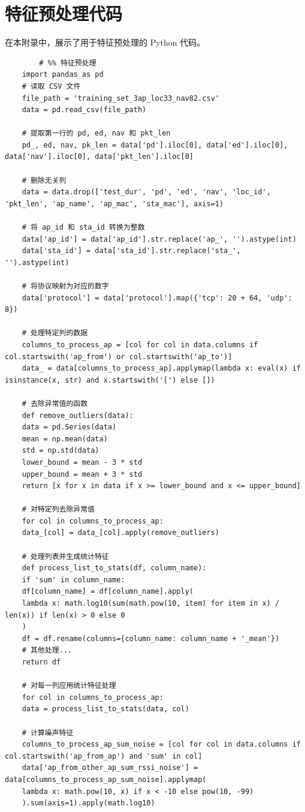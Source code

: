 \documentclass[bwprint]{gmcmthesis}
\begin{document}

\newpage

\appendix
\section{特征预处理代码}

\noindent 在本附录中，展示了用于特征预处理的 Python 代码。

\begin{lstlisting}
		# %% 特征预处理
	import pandas as pd
	# 读取 CSV 文件
	file_path = 'training_set_3ap_loc33_nav82.csv'
	data = pd.read_csv(file_path)
	
	# 提取第一行的 pd, ed, nav 和 pkt_len
	pd_, ed, nav, pk_len = data['pd'].iloc[0], data['ed'].iloc[0], data['nav'].iloc[0], data['pkt_len'].iloc[0]
	
	# 删除无关列
	data = data.drop(['test_dur', 'pd', 'ed', 'nav', 'loc_id', 'pkt_len', 'ap_name', 'ap_mac', 'sta_mac'], axis=1)
	
	# 将 ap_id 和 sta_id 转换为整数
	data['ap_id'] = data['ap_id'].str.replace('ap_', '').astype(int)
	data['sta_id'] = data['sta_id'].str.replace('sta_', '').astype(int)
	
	# 将协议映射为对应的数字
	data['protocol'] = data['protocol'].map({'tcp': 20 + 64, 'udp': 8})
	
	# 处理特定列的数据
	columns_to_process_ap = [col for col in data.columns if col.startswith('ap_from') or col.startswith('ap_to')]
	data_ = data[columns_to_process_ap].applymap(lambda x: eval(x) if isinstance(x, str) and x.startswith('[') else [])
	
	# 去除异常值的函数
	def remove_outliers(data):
	data = pd.Series(data)
	mean = np.mean(data)
	std = np.std(data)
	lower_bound = mean - 3 * std
	upper_bound = mean + 3 * std
	return [x for x in data if x >= lower_bound and x <= upper_bound]
	
	# 对特定列去除异常值
	for col in columns_to_process_ap:
	data_[col] = data_[col].apply(remove_outliers)
	
	# 处理列表并生成统计特征
	def process_list_to_stats(df, column_name):
	if 'sum' in column_name:
	df[column_name] = df[column_name].apply(
	lambda x: math.log10(sum(math.pow(10, item) for item in x) / len(x)) if len(x) > 0 else 0
	)
	df = df.rename(columns={column_name: column_name + '_mean'})
	# 其他处理...
	return df
	
	# 对每一列应用统计特征处理
	for col in columns_to_process_ap:
	data = process_list_to_stats(data, col)
	
	# 计算噪声特征
	columns_to_process_ap_sum_noise = [col for col in data.columns if col.startswith('ap_from_ap') and 'sum' in col]
	data['ap_from_other_ap_sum_rssi_noise'] = data[columns_to_process_ap_sum_noise].applymap(
	lambda x: math.pow(10, x) if x < -10 else pow(10, -99)
	).sum(axis=1).apply(math.log10)
\end{lstlisting}
\end{document}
